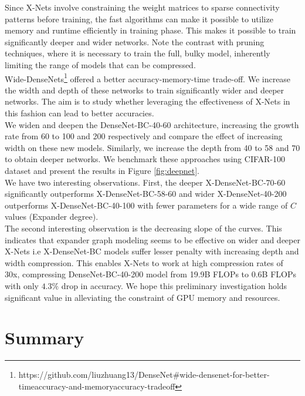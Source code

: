 \noindent Since X-Nets involve constraining the weight matrices to sparse connectivity patterns before training, the fast algorithms can make it possible to utilize memory and runtime efficiently in training phase. This makes it possible to train significantly deeper and wider networks. Note the contrast with pruning techniques, where it is necessary to train the full, bulky model, inherently limiting the range of models that can be compressed.\\

\noindent Wide-DenseNets\footnote{https://github.com/liuzhuang13/DenseNet\#wide-densenet-for-better-timeaccuracy-and-memoryaccuracy-tradeoff} offered a better accuracy-memory-time trade-off. We increase the width and depth of these networks to train significantly wider and deeper networks. The aim is to study whether leveraging the effectiveness of X-Nets in this fashion can lead to better accuracies. \\
  
\noindent We widen and deepen the DenseNet-BC-40-60 architecture, increasing the growth rate from 60 to 100 and 200 respectively and compare the effect of increasing width on these new models. Similarly, we increase the depth from 40 to 58 and 70 to obtain deeper networks. We benchmark these approaches using CIFAR-100 dataset and present the results in Figure \ref{fig:deepnet}. \\

\noindent We have two interesting observations. First, the deeper X-DenseNet-BC-70-60 significantly outperforms X-DenseNet-BC-58-60 and wider X-DenseNet-40-200 outperforms X-DenseNet-BC-40-100 with fewer parameters for a wide range of $C$ values (Expander degree). \\

\noindent The second interesting observation is the decreasing slope of the curves. This  indicates that expander graph modeling seems to be effective on wider and deeper X-Nets i.e X-DenseNet-BC models suffer lesser penalty with increasing depth and width compression. This enables X-Nets to work at high compression rates of 30x, compressing DenseNet-BC-40-200 model from 19.9B FLOPs to 0.6B FLOPs with only $4.3\%$ drop in accuracy. We hope this preliminary investigation holds significant value in alleviating the constraint of GPU memory and resources.

\section{Summary}

